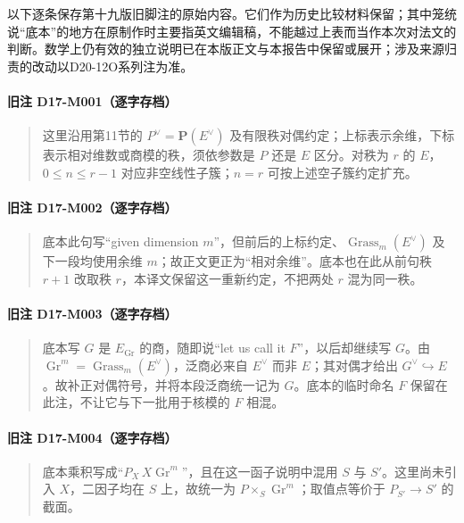 以下逐条保存第十九版旧脚注的原始内容。它们作为历史比较材料保留；其中笼统说“底本”的地方在原制作时主要指英文编辑稿，不能越过上表而当作本次对法文的判断。数学上仍有效的独立说明已在本版正文与本报告中保留或展开；涉及来源归责的改动以D20-12O系列注为准。

\paragraph*{旧注 D17-M001（逐字存档）}
\begin{quote}
这里沿用第11节的 $P^\vee=\mathbf P(E^\vee)$ 及有限秩对偶约定；上标表示余维，下标表示相对维数或商模的秩，须依参数是 $P$ 还是 $E$ 区分。对秩为 $r$ 的 $E$，$0\leq n\leq r-1$ 对应非空线性子簇；$n=r$ 可按上述空子簇约定扩充。
\end{quote}

\paragraph*{旧注 D17-M002（逐字存档）}
\begin{quote}
底本此句写“given dimension $m$”，但前后的上标约定、$\operatorname{Grass}_m(E^\vee)$ 及下一段均使用余维 $m$；故正文更正为“相对余维”。底本也在此从前句秩 $r+1$ 改取秩 $r$，本译文保留这一重新约定，不把两处 $r$ 混为同一秩。
\end{quote}

\paragraph*{旧注 D17-M003（逐字存档）}
\begin{quote}
底本写 $G$ 是 $E_{\operatorname{Gr}}$ 的商，随即说“let us call it $F$”，以后却继续写 $G$。由 $\operatorname{Gr}^m=\operatorname{Grass}_m(E^\vee)$，泛商必来自 $E^\vee$ 而非 $E$；其对偶才给出 $G^\vee\hookrightarrow E$。故补正对偶符号，并将本段泛商统一记为 $G$。底本的临时命名 $F$ 保留在此注，不让它与下一批用于核模的 $F$ 相混。
\end{quote}

\paragraph*{旧注 D17-M004（逐字存档）}
\begin{quote}
底本乘积写成“$P_X\,X\operatorname{Gr}^m$”，且在这一函子说明中混用 $S$ 与 $S'$。这里尚未引入 $X$，二因子均在 $S$ 上，故统一为 $P\times_S\operatorname{Gr}^m$；取值点等价于 $P_{S'}\to S'$ 的截面。
\end{quote}

